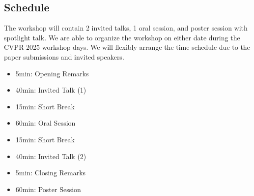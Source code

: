 \documentclass{article}
\begin{document}
\subsection{Schedule}
The workshop will contain 2 invited talks, 1 oral session, and poster session with spotlight talk. We are able to organize the workshop on either date during the CVPR 2025 workshop days. We will flexibly arrange the time schedule due to the paper submissions and invited speakers.
\begin{itemize}
    \item 5min: Opening Remarks
    \item 40min: Invited Talk (1)
    \item 15min: Short Break
    \item 60min: Oral Session
    \item 15min: Short Break
    \item 40min: Invited Talk (2)
    \item 5min: Closing Remarks
    \item 60min: Poster Session
\end{itemize}
\end{document}
